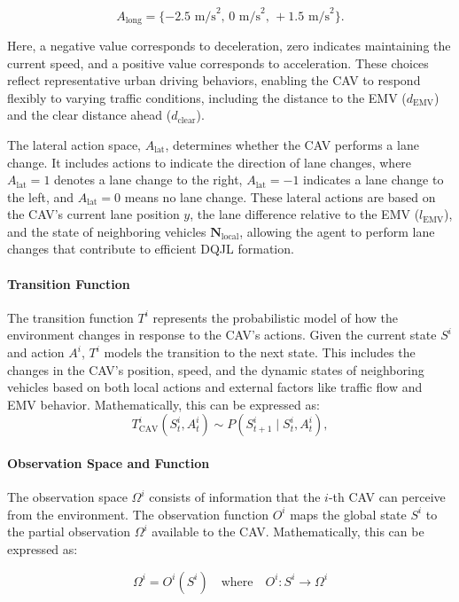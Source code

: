 \[
A_{\text{long}} = \{-2.5 \text{ m/s}^2,\, 0 \text{ m/s}^2,\, +1.5 \text{ m/s}^2\}.
\]

Here, a negative value corresponds to deceleration, zero indicates maintaining the current speed, and a positive value corresponds to acceleration. These choices reflect representative urban driving behaviors, enabling the CAV to respond flexibly to varying traffic conditions, including the distance to the EMV (\(d_{\text{EMV}}\)) and the clear distance ahead (\(d_{\text{clear}}\)).


The lateral action space, \(A_{\text{lat}}\), determines whether the CAV performs a lane change. It includes actions to indicate the direction of lane changes, where \(A_{\text{lat}} = 1\) denotes a lane change to the right, \(A_{\text{lat}} = -1\) indicates a lane change to the left, and \(A_{\text{lat}} = 0\) means no lane change. These lateral actions are based on the CAV’s current lane position \(y\), the lane difference relative to the EMV (\(l_{\text{EMV}}\)), and the state of neighboring vehicles \(\mathbf{N}_{\text{local}}\), allowing the agent to perform lane changes that contribute to efficient DQJL formation.

\paragraph{Transition Function}
The transition function \(T^i\) represents the probabilistic model of how the environment changes in response to the CAV’s actions. Given the current state \(S^i\) and action \(A^i\), \(T^i\) models the transition to the next state. This includes the changes in the CAV's position, speed, and the dynamic states of neighboring vehicles based on both local actions and external factors like traffic flow and EMV behavior. Mathematically, this can be expressed as:
\[
T^i_{\text{CAV}}(S^i_t, A^i_t) \sim P(S^i_{t+1} \mid S^i_t, A^i_t),
\]

\paragraph{Observation Space and Function}
The observation space \(\Omega^i\) consists of information that the \(i\)-th CAV can perceive from the environment. The observation function \(O^i\) maps the global state \(S^i\) to the partial observation \(\Omega^i\) available to the CAV. Mathematically, this can be expressed as:

\[
\Omega^i = O^i(S^i) \quad \text{where} \quad O^i: S^i \rightarrow \Omega^i
\]

